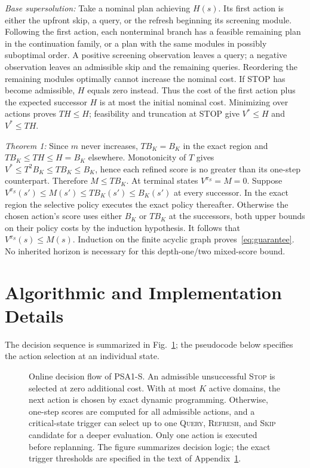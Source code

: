 \documentclass[conference]{IEEEtran}
\newcommand{\QUERY}{\textsc{Query}}
\newcommand{\REFRESH}{\textsc{Refresh}}
\newcommand{\SKIP}{\textsc{Skip}}
\newcommand{\STOP}{\textsc{Stop}}
\begin{document}
\textit{Base supersolution:} Take a nominal plan achieving $H(s)$. Its first action is either the upfront skip, a query, or the refresh beginning its screening module. Following the first action, each nonterminal branch has a feasible remaining plan in the continuation family, or a plan with the same modules in possibly suboptimal order. A positive screening observation leaves a query; a negative observation leaves an admissible skip and the remaining queries. Reordering the remaining modules optimally cannot increase the nominal cost. If STOP has become admissible, $H$ equals zero instead. Thus the cost of the first action plus the expected successor $H$ is at most the initial nominal cost. Minimizing over actions proves $TH\le H$; feasibility and truncation at STOP give $V^*\le H$ and $V^*\le TH$.

\textit{Theorem 1:} Since $m$ never increases, $TB_K=B_K$ in the exact region and $TB_K\le TH\le H=B_K$ elsewhere. Monotonicity of $T$ gives $V^*\le T^2B_K\le TB_K\le B_K$, hence each refined score is no greater than its one-step counterpart. Therefore $M\le TB_K$. At terminal states $V^{\pi_S}=M=0$. Suppose $V^{\pi_S}(s')\le M(s')\le TB_K(s')\le B_K(s')$ at every successor. In the exact region the selective policy executes the exact policy thereafter. Otherwise the chosen action's score uses either $B_K$ or $TB_K$ at the successors, both upper bounds on their policy costs by the induction hypothesis. It follows that $V^{\pi_S}(s)\le M(s)$. Induction on the finite acyclic graph proves~\eqref{eq:guarantee}. No inherited horizon is necessary for this depth-one/two mixed-score bound.

\section{Algorithmic and Implementation Details}
\label{app:algo}
The decision sequence is summarized in Fig.~\ref{fig:psa1s-flowchart}; the pseudocode below specifies the action selection at an individual state.

\begin{figure}[!t]
\centering

\caption{Online decision flow of PSA1-S. An admissible unsuccessful \STOP{} is selected at zero additional cost. With at most $K$ active domains, the next action is chosen by exact dynamic programming. Otherwise, one-step scores are computed for all admissible actions, and a critical-state trigger can select up to one \QUERY{}, \REFRESH{}, and \SKIP{} candidate for a deeper evaluation. Only one action is executed before replanning. The figure summarizes decision logic; the exact trigger thresholds are specified in the text of Appendix~\ref{app:algo}.}
\label{fig:psa1s-flowchart}
\end{figure}
\end{document}
